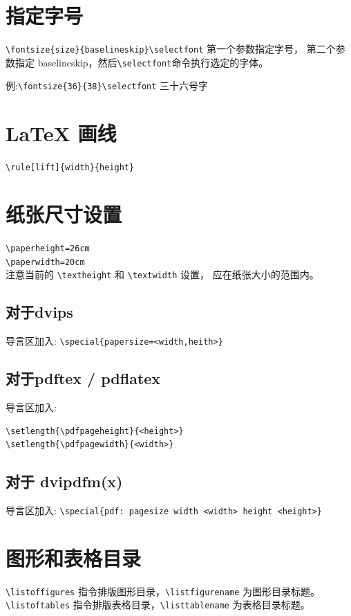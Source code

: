 \documentclass[a4paper,11pt]{article}
\begin{document}
\section{指定字号}
\verb+\fontsize{size}{baselineskip}\selectfont+ 第一个参数指定字号，
第二个参数指定 baselineskip，然后\verb+\selectfont+命令执行选定的字体。

例:\verb+\fontsize{36}{38}\selectfont+
{\fontsize{36}{38}\selectfont 三十六号字}

\section{\LaTeX{} 画线}
\verb+\rule[lift]{width}{height}+

\section{纸张尺寸设置}
\verb+\paperheight=26cm+\\
\verb+\paperwidth=20cm+\\

注意当前的 \verb+\textheight+ 和 \verb+\textwidth+ 设置，
应在纸张大小的范围内。

\subsection{对于dvips}
导言区加入: \verb+\special{papersize=<width,heith>}+

\subsection{对于pdftex / pdflatex}
导言区加入: 
\begin{Verbatim}
\setlength{\pdfpageheight}{<height>} 
\setlength{\pdfpagewidth}{<width>} 
\end{Verbatim}

\subsection{对于 dvipdfm(x)}
导言区加入: \verb+\special{pdf: pagesize width <width> height <height>}+


\section{图形和表格目录}
\verb+\listoffigures+ 指令排版图形目录，\verb+\listfigurename+
为图形目录标题。\\
\verb+\listoftables+ 指令排版表格目录，\verb+\listtablename+
为表格目录标题。
\end{document}
